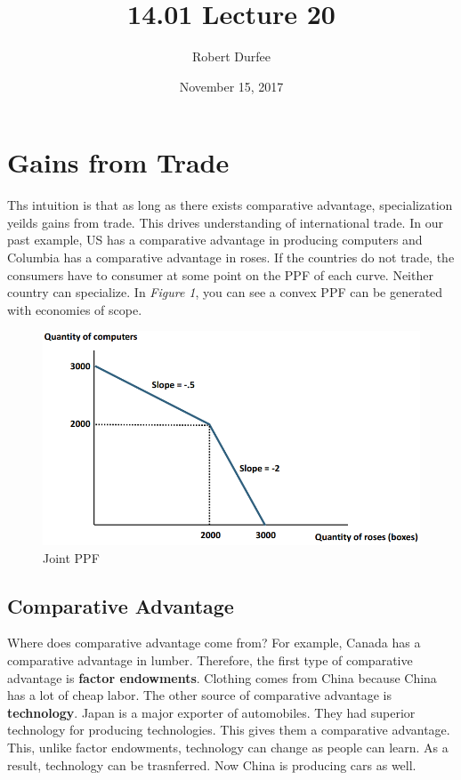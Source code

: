 \documentclass{article}
\title{ 14.01 Lecture 20}
\author{ Robert Durfee }
\date{ November 15, 2017 }
\begin{document}
\maketitle

\section{ Gains from Trade }

Ths intuition is that as long as there exists comparative advantage,
specialization yeilds gains from trade. This drives understanding of
international trade. In our past example, US has a comparative advantage in
producing computers and Columbia has a comparative advantage in roses. If the
countries do not trade, the consumers have to consumer at some point on the PPF
of each curve. Neither country can specialize. In \textit{Figure 1}, you can see
a convex PPF can be generated with economies of scope.

\begin{figure}[H]
    \centering
    \includegraphics[scale=0.8]{"Figure 1"}
    \caption{Joint PPF}
\end{figure}

\subsection{Comparative Advantage}

Where does comparative advantage come from? For example, Canada has a
comparative advantage in lumber. Therefore, the first type of comparative
advantage is \textbf{factor endowments}. Clothing comes from China because China
has a lot of cheap labor. The other source of comparative advantage is
\textbf{technology}. Japan is a major exporter of automobiles. They had
superior technology for producing technologies. This gives them a comparative
advantage. This, unlike factor endowments, technology can change as people can
learn. As a result, technology can be trasnferred. Now China is producing cars
as well.
\end{document}
